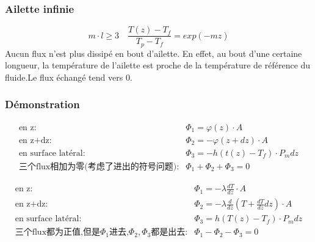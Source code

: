 \subsubsection{Ailette infinie}
$$
m\cdot l \geq 3 \quad  \frac{T(z)-T_f}{T_p - T_f}=exp(-mz)
$$
Aucun flux n'est plus dissip\'e en bout d'ailette. En effet, au bout d'une certaine longueur, la temp\'erature de l'ailette est proche de la temp\'erature de r\'ef\'erence du fluide.Le flux \'echang\'e tend vers $0$.

\subsubsection{D\'emonstration}
%

\begin{eqnarray}
 \text{en z:} & \Phi_1=\varphi(z)\cdot A \\
 \text{en z+dz:} &\Phi_2=-\varphi(z+dz) \cdot A\\
 \text{en surface lat\'eral:} & \Phi_3=-h(t(z)-T_f) \cdot P_m dz \\
 \text{三个flux相加为零(考虑了进出的符号问题):}  &\Phi_1 + \Phi_2 + \Phi_3 = 0
 \end{eqnarray}

\begin{eqnarray}
 \text{en z:} & \Phi_1=- \lambda \frac{dT}{dz} \cdot A \\
 \text{en z+dz:} &\Phi_2=-\lambda \frac{ d}{dz}(T+\frac{dT}{dz}dz) \cdot A\\
 \text{en surface lat\'eral:} & \Phi_3=h(T(z)-T_f) \cdot P_m dz \\
 \text{三个flux都为正值,但是$\Phi_1$进去,$\Phi_2,\Phi_3$都是出去:}  &\Phi_1 - \Phi_2 - \Phi_3 = 0\\
\end{eqnarray}

